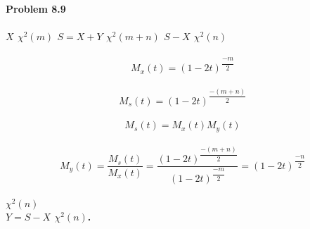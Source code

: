 \bf{Problem 8.9}
\\
\\  $X$  $\chi^{2}(m)$  $S = X+Y$  $ \chi^{2}(m + n)$  $S-X$  $\chi^{2}(n)$
\\
\\ \[ M_{x}(t) = (1-2t)^{\dfrac{-m}{2}}\]
\\ \[ M_{s}(t) = (1-2t)^{\dfrac{-(m+n)}{2}} \]
\\ \[ M_{s}(t) = M_{x}(t)M_{y}(t) \]
\\ \[ M_{y}(t) = \dfrac{M_{s}(t)}{M_{x}(t)} = \dfrac{(1-2t)^{\dfrac{-(m+n)}{2}}}{(1-2t)^{\dfrac{-m}{2}}} = (1-2t)^{\dfrac{-n}{2}} \]
\\  $\chi^{2}(n)$
\\  $ Y=S-X $  $\chi^{2}(n)$.